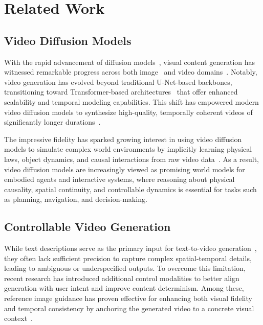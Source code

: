 \documentclass{article}
\begin{document}
\section{Related Work}
\subsection{Video Diffusion Models}
With the rapid advancement of diffusion models~\cite{sohl2015deep,ho2020denoising,songscore}, visual content generation has witnessed remarkable progress across both image~\cite{rombach2022high,podell2023sdxl,zhang2023hipa,zhang2023expanding,dai2024one,lin2025drivegen} and video domains~\cite{tian2024emo,zheng2024memo,blattmann2023stable,lin2024open,yang2024cogvideox}. Notably, video generation has evolved beyond traditional U-Net-based backbones, transitioning toward Transformer-based architectures~\cite{peebles2023scalable,vaswani2017attention} that offer enhanced scalability and temporal modeling capabilities. This shift has empowered modern video diffusion models to synthesize high-quality, temporally coherent videos of significantly longer durations~\cite{openai2024worldsim}.


The impressive fidelity has sparked growing interest in using video diffusion models to simulate complex world environments by implicitly learning physical laws, object dynamics, and causal interactions from raw video data~\cite{openai2024worldsim,parkerholder2024genie2,agarwal2025cosmos,yang2024position,yanglearning}. As a result, video diffusion models are increasingly viewed as promising world models for embodied agents and interactive systems, where reasoning about physical causality, spatial continuity, and controllable dynamics is essential for tasks such as planning, navigation, and decision-making.

\subsection{Controllable Video Generation}
While text descriptions serve as the primary input for text-to-video generation~\cite{kong2024hunyuanvideo,wang2025wan}, they often lack sufficient precision to capture complex spatial-temporal details, leading to ambiguous or underspecified outputs. To overcome this limitation, recent research has introduced additional control modalities to better align generation with user intent and improve content determinism. Among these, reference image guidance has proven effective for enhancing both visual fidelity and temporal consistency by anchoring the generated video to a concrete visual context~\cite{blattmann2023stable,ni2023conditional}.
 
\end{document}
